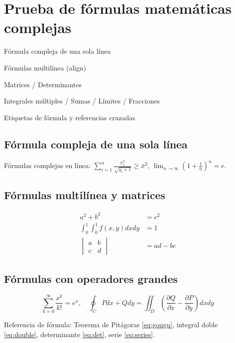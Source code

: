 \documentclass[es]{../../elegantbook}
\begin{document}
\chapter{Prueba de fórmulas matemáticas complejas}
\begin{introduction}
\item Fórmula compleja de una sola línea
\item Fórmulas multilínea (align)
\item Matrices / Determinantes
\item Integrales múltiples / Sumas / Límites / Fracciones
\item Etiquetas de fórmula y referencias cruzadas
\end{introduction}

\section{Fórmula compleja de una sola línea}
Fórmulas complejas en línea: $\sum_{i=1}^n \frac{x_i^2}{\sqrt{y_i+1}} \geq \bar{x}^2$, $\lim_{n\to\infty} \left(1+\frac{1}{n}\right)^n = e$.

\section{Fórmulas multilínea y matrices}
\begin{align}
a^2 + b^2 &= c^2 \label{eq:gougu} \\
\int_{0}^{1}\int_{0}^{1} f(x,y) dxdy &= 1 \label{eq:double} \\
\begin{vmatrix}
a & b \\
c & d
\end{vmatrix} &= ad-bc \label{eq:det}
\end{align}

\section{Fórmulas con operadores grandes}
\begin{equation}\label{eq:series}
\sum_{k=0}^{\infty} \frac{x^k}{k!} = e^x,\quad \oint_{C} Pdx+Qdy = \iint_{D}\left(\frac{\partial Q}{\partial x}-\frac{\partial P}{\partial y}\right)dxdy
\end{equation}

Referencia de fórmula: Teorema de Pitágoras \eqref{eq:gougu}, integral doble \eqref{eq:double}, determinante \eqref{eq:det}, serie \eqref{eq:series}.
\end{document}
